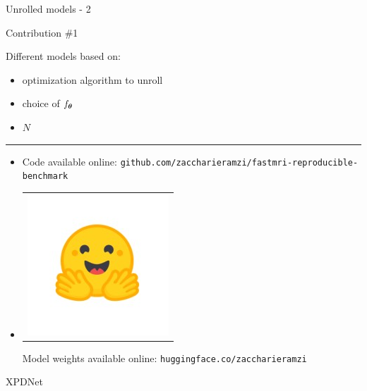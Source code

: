 \begin{frame}{Unrolled models - 2}
    \begin{exampleblock}{Contribution \#1}
    \end{exampleblock}
    Different models based on:
    \begin{itemize}
        \item optimization algorithm to unroll
        \item choice of $f_{{\boldsymbol{\theta}}}$
        \item $N$
    \end{itemize}


    \noindent\rule{\textwidth}{1pt}

        \begin{itemize}
            \item {} Code available online: \texttt{github.com/zaccharieramzi/fastmri-reproducible-benchmark}
            \item\begin{tabular}{@{}c@{}}\includegraphics[width=3ex]{Figures/hf_logo.jpeg}\end{tabular}Model weights available online: \texttt{huggingface.co/zaccharieramzi}
        \end{itemize}



\end{frame}

\begin{frame}{XPDNet}

\end{frame}

